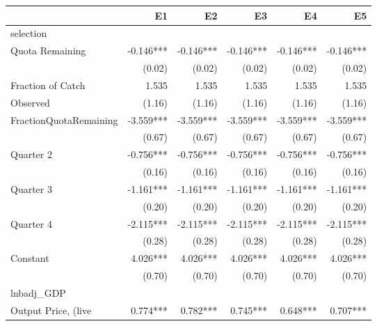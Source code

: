 {
\def\sym#1{\ifmmode^{#1}\else\(^{#1}\)\fi}
\begin{tabular}{l*{5}{r}}
\hline\hline
                    &          E1   &          E2   &          E3   &          E4   &          E5   \\
\hline
selection           &               &               &               &               &               \\
Quota Remaining     &      -0.146***&      -0.146***&      -0.146***&      -0.146***&      -0.146***\\
                    &      (0.02)   &      (0.02)   &      (0.02)   &      (0.02)   &      (0.02)   \\
Fraction of Catch   &       1.535   &       1.535   &       1.535   &       1.535   &       1.535   \\
Observed            &      (1.16)   &      (1.16)   &      (1.16)   &      (1.16)   &      (1.16)   \\
FractionQuotaRemaining&      -3.559***&      -3.559***&      -3.559***&      -3.559***&      -3.559***\\
                    &      (0.67)   &      (0.67)   &      (0.67)   &      (0.67)   &      (0.67)   \\
Quarter 2           &      -0.756***&      -0.756***&      -0.756***&      -0.756***&      -0.756***\\
                    &      (0.16)   &      (0.16)   &      (0.16)   &      (0.16)   &      (0.16)   \\
Quarter 3           &      -1.161***&      -1.161***&      -1.161***&      -1.161***&      -1.161***\\
                    &      (0.20)   &      (0.20)   &      (0.20)   &      (0.20)   &      (0.20)   \\
Quarter 4           &      -2.115***&      -2.115***&      -2.115***&      -2.115***&      -2.115***\\
                    &      (0.28)   &      (0.28)   &      (0.28)   &      (0.28)   &      (0.28)   \\
Constant               &       4.026***&       4.026***&       4.026***&       4.026***&       4.026***\\
                    &      (0.70)   &      (0.70)   &      (0.70)   &      (0.70)   &      (0.70)   \\
\hline
lnbadj\_GDP          &               &               &               &               &               \\
Output Price, (live &       0.774***&       0.782***&       0.745***&       0.648***&       0.707***\\

\end{tabular}}
